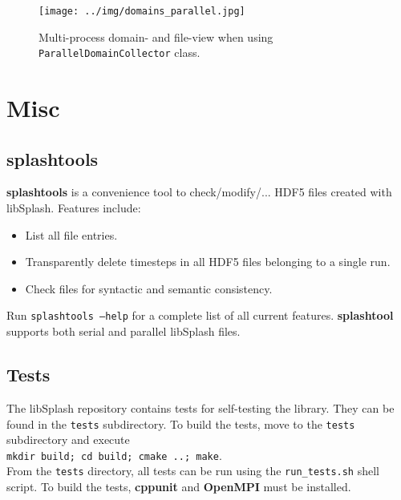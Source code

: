 \documentclass[a4paper,10pt,BCOR12mm]{report}
\newcommand{\command}[1]{\small \texttt{#1}}
\newcommand{\code}[1]{\small \texttt{#1}}
\begin{document}
\begin{figure}[h]
 \texttt{[image: ../img/domains\_parallel.jpg]}
 \caption{Multi-process domain- and file-view when using \code{ParallelDomainCollector} class.}
\end{figure}


\chapter{Misc}


\section{splashtools}

\textbf{splashtools} is a convenience tool to check/modify/... HDF5 files created with libSplash.
Features include:
\begin{itemize}
	\item List all file entries.
	\item Transparently delete timesteps in all HDF5 files belonging to a single run.
	\item Check files for syntactic and semantic consistency.
\end{itemize}
Run \command{splashtools --help} for a complete list of all current features.
\textbf{splashtool} supports both serial and parallel libSplash files.


\section{Tests}

The libSplash repository contains tests for self-testing the library. They can be found in the
\command{tests} subdirectory. To build the tests, move to the \command{tests} subdirectory and execute\\
\command{mkdir build; cd build; cmake ..; make}.\\
From the \command{tests} directory, all tests can be run using the \command{run\_tests.sh} shell script.
To build the tests, \textbf{cppunit} and \textbf{OpenMPI} must be installed.

\end{document}
